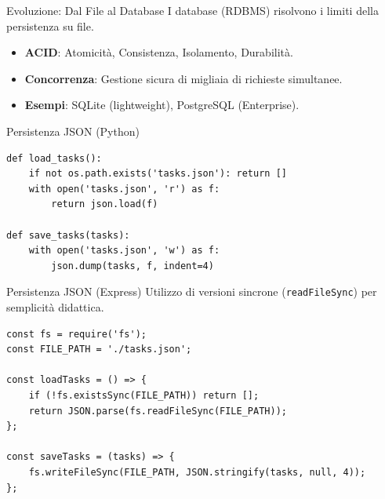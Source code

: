 \documentclass[10pt]{beamer}
\begin{document}
\begin{frame}{Evoluzione: Dal File al Database}
    I database (RDBMS) risolvono i limiti della persistenza su file.
    \begin{itemize}
        \item \textbf{ACID}: Atomicità, Consistenza, Isolamento, Durabilità.
        \item \textbf{Concorrenza}: Gestione sicura di migliaia di richieste simultanee.
        \item \textbf{Esempi}: SQLite (lightweight), PostgreSQL (Enterprise).
    \end{itemize}
\end{frame}

\begin{frame}[fragile]{Persistenza JSON (Python)}
    \begin{verbatim}
def load_tasks():
    if not os.path.exists('tasks.json'): return []
    with open('tasks.json', 'r') as f:
        return json.load(f)

def save_tasks(tasks):
    with open('tasks.json', 'w') as f:
        json.dump(tasks, f, indent=4)
    \end{verbatim}
\end{frame}

\begin{frame}[fragile]{Persistenza JSON (Express)}
    Utilizzo di versioni sincrone (\texttt{readFileSync}) per semplicità didattica.
    \begin{verbatim}
const fs = require('fs');
const FILE_PATH = './tasks.json';

const loadTasks = () => {
    if (!fs.existsSync(FILE_PATH)) return [];
    return JSON.parse(fs.readFileSync(FILE_PATH));
};

const saveTasks = (tasks) => {
    fs.writeFileSync(FILE_PATH, JSON.stringify(tasks, null, 4));
};
    \end{verbatim}
\end{frame}
\end{document}
